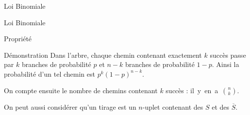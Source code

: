 \documentclass{coursbook}
\begin{document}
\begin{Gpartie}{Loi Binomiale}
\begin{Spartie}{Loi Binomiale}
\begin{SSpartie}{Propriété}
\begin{center}
                        \parbox{\linewidth}{}
                \end{center}
                \begin{SSSpartie}{Démonstration} 
                    Dans l'arbre, chaque chemin contenant exactement $k$ succès passe par $k$ branches de probabilité $p$ et $n-k$ branches de probabilité $1-p$. Ainsi la probabilité d'un tel chemin est $p^k(1-p)^{n-k}$.

                    On compte ensuite le nombre de chemins contenant $k$ succès : il~y~en~a~$\binom{n}{k}$.

                    On peut aussi considérer qu'un tirage est un $n$-uplet contenant des $S$ et des $\overline{S}$.


\end{SSSpartie}
\end{SSpartie}
\end{Spartie}
\end{Gpartie}
\end{document}
